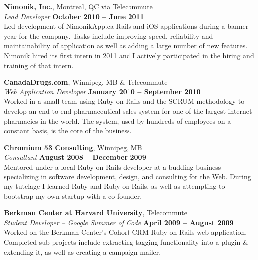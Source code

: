 \documentclass[margin,line,letterpaper]{resume}
\begin{document}
\begin{resume}
  {\bf Nimonik, Inc.}, Montreal, QC via Telecommute \vspace{2mm}\\\vspace{1mm}%
  {\sl Lead Developer} \hfill {\bf October 2010 -- June 2011}\\
  Led development of NimonikApp.ca Rails and iOS applications during a banner year for the company. Tasks include improving speed, reliability and maintainability of application as well as adding a large number of new features. Nimonik hired its first intern in 2011 and I actively participated in the hiring and training of that intern.

  {\bf CanadaDrugs.com}, Winnipeg, MB \& Telecommute \vspace{2mm}\\\vspace{1mm}%
  {\sl Web Application Developer} \hfill {\bf January 2010 -- September 2010}\\
  Worked in a small team using Ruby on Rails and the SCRUM methodology to develop an end-to-end pharmaceutical sales system for one of the largest internet pharmacies in the world. The system, used by hundreds of employees on a constant basis, is the core of the business.

  {\bf Chromium 53 Consulting}, Winnipeg, MB \vspace{2mm}\\\vspace{1mm}%
  {\sl Consultant} \hfill {\bf August 2008 -- December 2009}\\
  Mentored under a local Ruby on Rails developer at a budding business specializing in software development, design, and consulting for the Web. During my tutelage I learned Ruby and Ruby on Rails, as well as attempting to bootstrap my own startup with a co-founder.

  {\bf Berkman Center at Harvard University}, Telecommute \vspace{2mm}\\\vspace{1mm}%
  {\sl Student Developer – Google Summer of Code} \hfill {\bf April 2009 -- August 2009}\\
  Worked on the Berkman Center’s Cohort CRM Ruby on Rails web application. Completed sub-projects include extracting tagging functionality into a plugin \& extending it, as well as creating a campaign mailer.


\end{resume}
\end{document}
